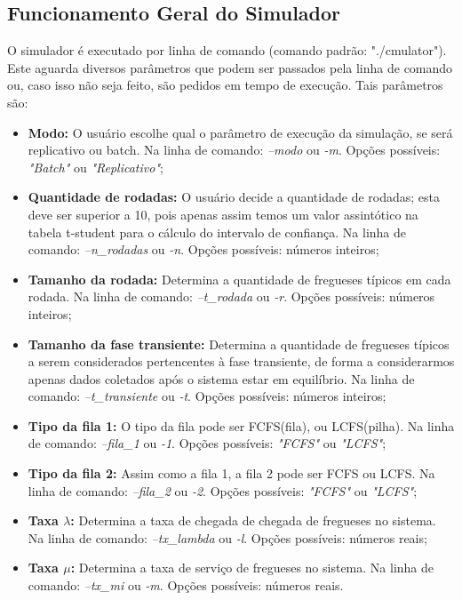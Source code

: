 \documentclass[a4paper,10pt]{article}
\begin{document}
\subsection{Funcionamento Geral do Simulador}

    O simulador é executado por linha de comando (comando padrão: "./cmulator"). Este aguarda diversos parâmetros que podem ser passados pela linha de comando ou, caso isso não seja feito, são pedidos em tempo de execução. Tais parâmetros são:

\begin {itemize}
\item \textbf{Modo:} O usuário escolhe qual o parâmetro de execução da simulação, se será replicativo ou batch. Na linha de comando: \emph{--modo} ou \emph{-m}. Opções possíveis: \emph{"Batch"} ou \emph{"Replicativo"};

\item \textbf{Quantidade de rodadas:} O usuário decide a quantidade de rodadas; esta deve ser superior a 10, pois apenas assim temos um valor assintótico na tabela t-student para o cálculo do intervalo de confiança. Na linha de comando: \emph{--n\_rodadas} ou \emph{-n}. Opções possíveis: números inteiros;

\item \textbf{Tamanho da rodada:} Determina a quantidade de fregueses típicos em cada rodada. Na linha de comando: \emph{--t\_rodada} ou \emph{-r}. Opções possíveis: números inteiros;

\item \textbf{Tamanho da fase transiente:} Determina a quantidade de fregueses típicos a serem considerados pertencentes à fase transiente, de forma a considerarmos apenas dados coletados após o sistema estar em equilíbrio. Na linha de comando: \emph{--t\_transiente} ou \emph{-t}. Opções possíveis: números inteiros;

\item \textbf{Tipo da fila 1:} O tipo da fila pode ser FCFS(fila), ou LCFS(pilha). Na linha de comando: \emph{--fila\_1} ou \emph{-1}. Opções possíveis: \emph{"FCFS"} ou \emph{"LCFS"};

\item \textbf{Tipo da fila 2:} Assim como a fila 1, a fila 2 pode ser FCFS ou LCFS. Na linha de comando: \emph{--fila\_2} ou \emph{-2}. Opções possíveis: \emph{"FCFS"} ou \emph{"LCFS"};

\item \textbf{Taxa $\lambda$:} Determina a taxa de chegada de chegada de fregueses no sistema. Na linha de comando: \emph{--tx\_lambda} ou \emph{-l}. Opções possíveis: números reais;

\item \textbf{Taxa $\mu$:} Determina a taxa de serviço de fregueses no sistema. Na linha de comando: \emph{--tx\_mi} ou \emph{-m}. Opções possíveis: números reais.
\end {itemize}
\end{document}

